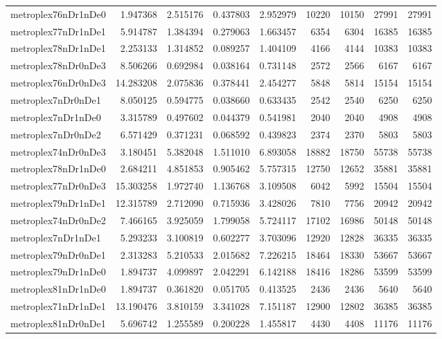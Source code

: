 \begin{longtable}{|l|r|r|r|r|r|r|r|r|}
metroplex76nDr1nDe0 & 1.947368 & 2.515176 & 0.437803 & 2.952979 & 10220 & 10150 & 27991 & 27991 \\
metroplex77nDr1nDe1 & 5.914787 & 1.384394 & 0.279063 & 1.663457 & 6354 & 6304 & 16385 & 16385 \\
metroplex78nDr1nDe1 & 2.253133 & 1.314852 & 0.089257 & 1.404109 & 4166 & 4144 & 10383 & 10383 \\
metroplex78nDr0nDe3 & 8.506266 & 0.692984 & 0.038164 & 0.731148 & 2572 & 2566 & 6167 & 6167 \\
metroplex76nDr0nDe3 & 14.283208 & 2.075836 & 0.378441 & 2.454277 & 5848 & 5814 & 15154 & 15154 \\
metroplex7nDr0nDe1 & 8.050125 & 0.594775 & 0.038660 & 0.633435 & 2542 & 2540 & 6250 & 6250 \\
metroplex7nDr1nDe0 & 3.315789 & 0.497602 & 0.044379 & 0.541981 & 2040 & 2040 & 4908 & 4908 \\
metroplex7nDr0nDe2 & 6.571429 & 0.371231 & 0.068592 & 0.439823 & 2374 & 2370 & 5803 & 5803 \\
metroplex74nDr0nDe3 & 3.180451 & 5.382048 & 1.511010 & 6.893058 & 18882 & 18750 & 55738 & 55738 \\
metroplex78nDr1nDe0 & 2.684211 & 4.851853 & 0.905462 & 5.757315 & 12750 & 12652 & 35881 & 35881 \\
metroplex77nDr0nDe3 & 15.303258 & 1.972740 & 1.136768 & 3.109508 & 6042 & 5992 & 15504 & 15504 \\
metroplex79nDr1nDe1 & 12.315789 & 2.712090 & 0.715936 & 3.428026 & 7810 & 7756 & 20942 & 20942 \\
metroplex74nDr0nDe2 & 7.466165 & 3.925059 & 1.799058 & 5.724117 & 17102 & 16986 & 50148 & 50148 \\
metroplex7nDr1nDe1 & 5.293233 & 3.100819 & 0.602277 & 3.703096 & 12920 & 12828 & 36335 & 36335 \\
metroplex79nDr0nDe1 & 2.313283 & 5.210533 & 2.015682 & 7.226215 & 18464 & 18330 & 53667 & 53667 \\
metroplex79nDr1nDe0 & 1.894737 & 4.099897 & 2.042291 & 6.142188 & 18416 & 18286 & 53599 & 53599 \\
metroplex81nDr1nDe0 & 1.894737 & 0.361820 & 0.051705 & 0.413525 & 2436 & 2436 & 5640 & 5640 \\
metroplex71nDr1nDe1 & 13.190476 & 3.810159 & 3.341028 & 7.151187 & 12900 & 12802 & 36385 & 36385 \\
metroplex81nDr0nDe1 & 5.696742 & 1.255589 & 0.200228 & 1.455817 & 4430 & 4408 & 11176 & 11176 \\

\end{longtable}
